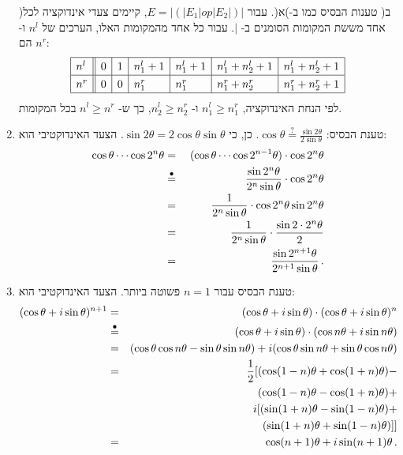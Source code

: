 \begin{enumerate}
)ב( טענות הבסיס כמו ב-)א(. עבור
$E=|(|E_1 | \textit{op} | E_2|)|$,
קיימים צעדי אינדוקציה לכל אחד מששת המקומות הסומנים ב-%
$|$.
עבור כל אחד מהמקומות האלו, הערכים של
$n^l$
ו-%
$n^r$
הם:
\[
\renewcommand{\arraystretch}{1.3}
\begin{array}{|l||l|l|l|l|l|l|}
\hline
n^l&0& 1& n_1^l+1& n_1^l+1& n_1^l+n_2^l+1& n_1^l+n_2^l+1\\\hline
n^r&0& 0& n_1^r& n_1^r& n_1^r+n_2^r& n_1^r+n_2^r+1\\\hline
\end{array}
\]
לפי הנחת האינדוקציה,
$n_1^l \geq n_1^r$
ו-
$n_2^l \geq n_2^r$,
כך ש-%
$n^l\geq n^r$
בכל המקומות.

\item 
טענת הבסיס:
$\cos \theta \stackrel{?}{=} \frac{\sin 2\theta}{2\sin \theta}$.
כן, כי
$\sin 2\theta = 2\cos\theta\sin\theta$.
הצעד האינדוקטיבי הוא:
\begin{eqnarray*}
\cos\theta\cdots \cos 2^{n}\theta &=& (\cos\theta\cdots \cos 2^{n-1}\theta) \cdot \cos 2^{n}\theta\\
&\stackrel{\bullet}{=}{}&\frac{\sin 2^{n}\theta}{2^{n}\sin \theta}\cdot \cos 2^{n}\theta\\
&=& \frac{1}{2^{n}\sin \theta} \cdot \cos 2^n\theta\sin 2^{n}\theta\\
&=& \frac{1}{2^{n}\sin \theta} \cdot \frac{\sin 2\cdot 2^{n}\theta}{2}\\
&=&\frac{\sin 2^{n+1}\theta}{2^{n+1}\sin \theta}\,.
\end{eqnarray*}

\item
טענת הבסיס עבור
$n=1$
פשוטה ביותר. הצעד האינדוקטיבי הוא:
\begin{eqnarray*}
(\cos \theta + i\sin\theta)^{n+1} &=& (\cos \theta + i\sin \theta)\cdot (\cos \theta + i\sin \theta)^n\\
&\stackrel{\bullet}{=}& (\cos \theta + i\sin \theta)\cdot (\cos n\theta + i\sin n\theta)\\
&=& (\cos\theta \cos n\theta - \sin \theta \sin n\theta) + i (\cos \theta \sin n\theta + \sin\theta \cos n\theta)\\
&=& \frac{1}{2} [(\cos (1-n)\theta + \cos (1+n)\theta) -\\
&&\;\;\;\;(\cos(1-n)\theta - \cos (1+n)\theta) +\\
&& \;\;i[(\sin (1+n)\theta - \sin (1-n)\theta) +\\
&&\;\;\;\;(\sin(1+n)\theta + \sin (1-n)\theta)]]\\
&=& \cos (n+1)\theta + i\sin (n+1)\theta\,.
\end{eqnarray*}


\end{enumerate}
